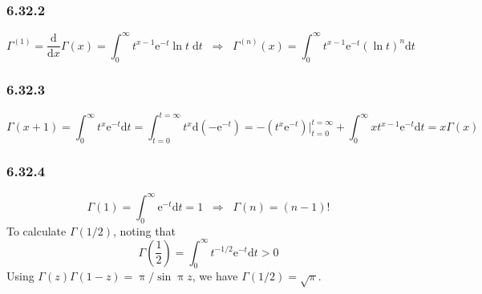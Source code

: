 \documentclass[]{ctexart}
\begin{document}
	\subsubsection*{6.32.2}
	\begin{equation*}
	\Gamma^{(1)}=\frac{\mathrm{d}}{\mathrm{d}x}\Gamma(x)=\int_0^\infty t^{x-1}\mathrm{e}^{-t}\ln t\;\mathrm{d}t\;\;\Rightarrow\;\;\Gamma^{(n)}(x)=\int_0^\infty t^{x-1}\mathrm{e}^{-t}(\ln t)^n\mathrm{d}t
	\end{equation*}
	\subsubsection*{6.32.3}
	\begin{equation*}
	\Gamma(x+1)=\int_0^\infty t^x\mathrm{e}^{-t}\mathrm{d}t=\int_{t=0}^{t=\infty}t^x\mathrm{d}(-\mathrm{e}^{-t})=-(t^x\mathrm{e}^{-t})\big|_{t=0}^{t=\infty}+\int_0^\infty xt^{x-1}\mathrm{e}^{-t}\mathrm{d}t=x\Gamma(x)
	\end{equation*}
	\subsubsection*{6.32.4}
	\begin{equation*}
	\Gamma(1)=\int_0^\infty\mathrm{e}^{-t}\mathrm{d}t=1\;\;\Rightarrow\;\;\Gamma(n)=(n-1)!
	\end{equation*}
	To calculate $\Gamma(1/2)$, noting that
	\begin{equation*}
	\Gamma\left(\frac 12\right)=\int_0^\infty t^{-1/2}\mathrm{e}^{-t}\mathrm{d}t>0
	\end{equation*}
	Using $\Gamma(z)\Gamma(1-z)=\uppi/\sin\uppi z$, we have $\Gamma(1/2)=\sqrt{\pi}$. 
\end{document}
